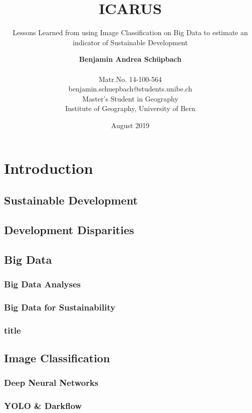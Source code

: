 \documentclass[12pt]{scrartcl}
\author{\textbf{Benjamin Andrea Schüpbach}\\ \\Matr.No. 14-100-564\\benjamin.schuepbach@students.unibe.ch\\Master's Student in Geography\\Institute of Geography, University of Bern\\}
\date{August 2019}
\title{\textbf{ICARUS\\}}
\subtitle{Lessons Learned from using Image Classification on Big Data to estimate an indicator of Sustainable Development\\}
\begin{document}
	\maketitle
	\newpage
	
	
	
	\section{Introduction}
		
		\nocite{*}
		\subsection{Sustainable Development}
		
		
		
		\subsection{Development Disparities}
		
		
		
		\subsection{Big Data}
			\subsubsection{Big Data Analyses}
			
			\subsubsection{Big Data for Sustainability}
			
			\subsubsection{title}
			
			
			
		\subsection{Image Classification}
			\subsubsection{Deep Neural Networks}
			
			\subsubsection{YOLO \& Darkflow}
			
\end{document}
